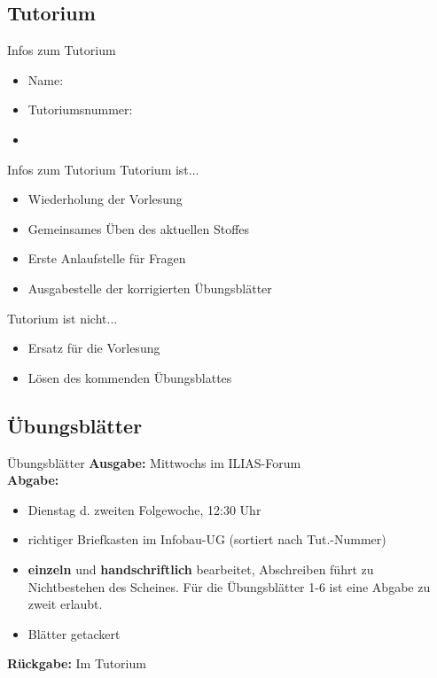 \subsection{Tutorium}

	\aboutMeFrame



	\begin{frame}{Infos zum Tutorium}
		\begin{itemize}
			\item Name: \myname
			\item Tutoriumsnummer: \mytutnumber
			\item \mytutinfos
		\end{itemize}	
	\end{frame}

	\begin{frame}{Infos zum Tutorium}
		Tutorium ist...\\
		\begin{itemize}
			\item Wiederholung der Vorlesung
			\item Gemeinsames Üben des aktuellen Stoffes
			\item Erste Anlaufstelle für Fragen
			\item Ausgabestelle der korrigierten Übungsblätter
		\end{itemize}
		\pause
		Tutorium ist nicht...\\
		\begin{itemize}
			\item Ersatz für die Vorlesung
			\item Lösen des kommenden Übungsblattes
		\end{itemize}
	\end{frame}
	
	
\subsection{Übungsblätter}
	\begin{frame}{Übungsblätter}
		\textbf{Ausgabe:} Mittwochs im ILIAS-Forum \\
		\pause
		\textbf{Abgabe:}
			\begin{itemize}
				\item Dienstag d. zweiten Folgewoche, 12:30 Uhr
				\item richtiger Briefkasten im Infobau-UG (sortiert nach Tut.-Nummer)
				\pause
				\item \textbf{einzeln} und \textbf{handschriftlich} bearbeitet, Abschreiben führt zu Nichtbestehen des Scheines. Für die Übungsblätter 1-6 ist eine Abgabe zu zweit erlaubt.
				\item Blätter getackert
			\end{itemize}
		\pause	
		\textbf{Rückgabe:} Im Tutorium
	\end{frame}
